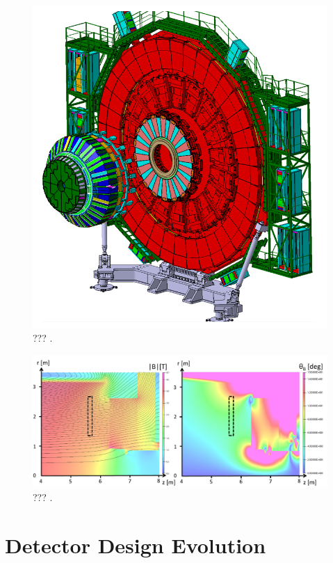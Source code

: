     \begin{figure}[h!]
      \centering
      \includegraphics[width=\textwidth]{img/II-1-gem/wheel.png}
      \caption{??? \cite{Colaleo:2021453}.}
      \label{fig:II-1-gem-wheel}
    \end{figure}

    \begin{figure}[h!]
      \centering
      \includegraphics[width=\textwidth]{img/II-1-gem/field-map.pdf}
      \caption{??? \cite{Colaleo:2021453}.}
      \label{fig:II-1-gem-field-map}
    \end{figure}

  \section{Detector Design Evolution}

